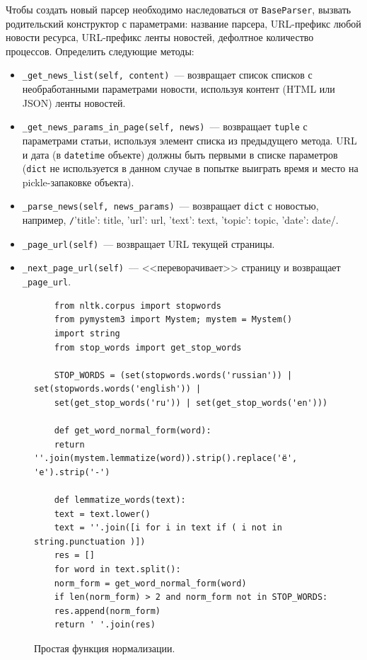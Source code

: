 \documentclass[a4paper, 14pt]{extarticle}
\begin{document}
Чтобы создать новый парсер необходимо наследоваться от \texttt{BaseParser}, вызвать родительский конструктор с параметрами: название парсера, URL-префикс любой новости ресурса, URL-префикс ленты новостей, дефолтное количество процессов. Определить следующие методы:
\begin{itemize}
	\item \texttt{\_get\_news\_list(self, content)}~--- возвращает список списков с необработанными параметрами новости, используя контент (HTML или JSON) ленты новостей.
	\item \texttt{\_get\_news\_params\_in\_page(self, news)}~--- возвращает \texttt{tuple} с параметрами статьи, используя элемент списка из предыдущего метода. URL и дата (в \texttt{datetime} объекте) должны быть первыми в списке параметров (\texttt{dict} не используется в данном случае в попытке выиграть время и место на pickle-запаковке объекта).
	\item \texttt{\_parse\_news(self, news\_params)}~--- возвращает \texttt{dict} с новостью, например, \texttt/{'title': title, 'url': url, 'text': text, 'topic': topic, 'date': date}/.
	\item \texttt{\_page\_url(self)}~--- возвращает URL текущей страницы.
	\item \texttt{\_next\_page\_url(self)}~--- <<переворачивает>> страницу и возвращает \texttt{\_page\_url}.
\end{itemize}





\begin{figure}
	\centering
	\begin{verbatim}
	from nltk.corpus import stopwords
	from pymystem3 import Mystem; mystem = Mystem()
	import string
	from stop_words import get_stop_words
	
	STOP_WORDS = (set(stopwords.words('russian')) | set(stopwords.words('english')) | 
	set(get_stop_words('ru')) | set(get_stop_words('en')))
	
	def get_word_normal_form(word):
	return ''.join(mystem.lemmatize(word)).strip().replace('ё', 'е').strip('-')
	
	def lemmatize_words(text):
	text = text.lower()
	text = ''.join([i for i in text if ( i not in string.punctuation )])
	res = []
	for word in text.split():
	norm_form = get_word_normal_form(word)
	if len(norm_form) > 2 and norm_form not in STOP_WORDS:
	res.append(norm_form)
	return ' '.join(res)
	\end{verbatim}
	\caption{Простая функция нормализации.}
	\label{norm}
\end{figure}
\end{document}
